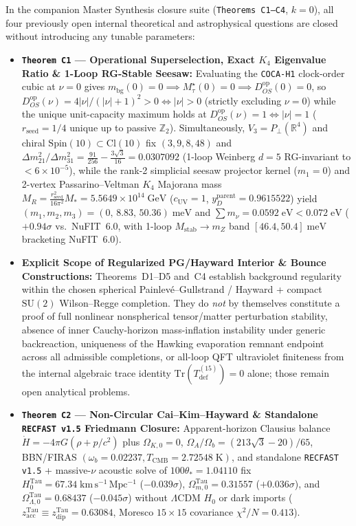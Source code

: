 \documentclass[11pt,a4paper]{article}
\theoremstyle{remark}
\begin{document}
In the companion Master Synthesis closure suite (\texttt{Theorems~C1--C4}, $k = 0$), all four previously open internal theoretical and astrophysical questions are closed without introducing any tunable parameters:
\begin{itemize}
  \item \textbf{\texttt{Theorem C1} --- Operational Superselection, Exact $K_4$ Eigenvalue Ratio \& 1-Loop RG-Stable Seesaw:} Evaluating the \texttt{COCA-H1} clock-order cubic at $\nu = 0$ gives $m_{\mathrm{bg}}(0) = 0 \implies M_\tau^\star(0) = 0 \implies D_{OS}^{\mathrm{op}}(0) = 0$, so $D_{OS}^{\mathrm{op}}(\nu) = 4|\nu|/(|\nu|+1)^2 > 0 \iff |\nu| > 0$ (strictly excluding $\nu = 0$) while the unique unit-capacity maximum holds at $D_{OS}^{\mathrm{op}}(\nu) = 1 \iff |\nu| = 1$ ($r_{\mathrm{seed}} = 1/4$ unique up to passive $\mathbb{Z}_2$). Simultaneously, $V_3 = P_\perp(\mathbb{R}^4)$ and chiral $\mathrm{Spin}(10) \subset \mathrm{Cl}(10)$ fix $(3, 9, 8, 48)$ and $\Delta m_{21}^2/\Delta m_{31}^2 = \frac{91}{256} - \frac{3\sqrt{3}}{16} = 0.0307092$ (1-loop Weinberg $d=5$ RG-invariant to $<6\times 10^{-5}$), while the rank-2 simplicial seesaw projector kernel ($m_1 = 0$) and 2-vertex Passarino--Veltman $K_4$ Majorana mass $M_R = \frac{r_{\mathrm{seed}}^2}{16\pi^2}M_* = 5.5649 \times 10^{14}\;\mathrm{GeV}$ ($c_{\mathrm{UV}} = 1$, $y_D^{\mathrm{parent}} = 0.9615522$) yield $(m_1, m_2, m_3) = (0,\, 8.83,\, 50.36)\;\mathrm{meV}$ and $\sum m_\nu = 0.0592\;\mathrm{eV} < 0.072\;\mathrm{eV}$ (\textbf{$+0.94\sigma$} vs.\ NuFIT~6.0, with 1-loop $M_{\mathrm{stab}}\to m_Z$ band $[46.4, 50.4]\;\mathrm{meV}$ bracketing NuFIT~6.0).
  \item \textbf{Explicit Scope of Regularized PG/Hayward Interior \& Bounce Constructions:} Theorems~D1--D5 and~C4 establish background regularity within the chosen spherical Painlev\'e--Gullstrand / Hayward + compact $\mathrm{SU}(2)$ Wilson--Regge completion. They do \emph{not} by themselves constitute a proof of full nonlinear nonspherical tensor/matter perturbation stability, absence of inner Cauchy-horizon mass-inflation instability under generic backreaction, uniqueness of the Hawking evaporation remnant endpoint across all admissible completions, or all-loop QFT ultraviolet finiteness from the internal algebraic trace identity $\mathrm{Tr}(T_{\mathrm{def}}^{(15)}) = 0$ alone; those remain open analytical problems.
  \item \textbf{\texttt{Theorem C2} --- Non-Circular Cai--Kim--Hayward \& Standalone \texttt{RECFAST v1.5} Friedmann Closure:} Apparent-horizon Clausius balance $\dot{H} = -4\pi G(\rho + p/c^2)$ plus $\Omega_{K,0} = 0$, $\Omega_A/\Omega_b = (213\sqrt{3}-20)/65$, BBN/FIRAS $(\omega_b = 0.02237, T_{\mathrm{CMB}} = 2.72548\;\mathrm{K})$, and standalone \texttt{RECFAST v1.5} + massive-$\nu$ acoustic solve of $100\theta_* = 1.04110$ fix $H_0^{\mathrm{Tau}} = 67.34\;\mathrm{km\,s^{-1}\,Mpc^{-1}}$ ($-0.039\sigma$), $\Omega_{m,0}^{\mathrm{Tau}} = 0.31557$ ($+0.036\sigma$), and $\Omega_{\Lambda,0}^{\mathrm{Tau}} = 0.68437$ ($-0.045\sigma$) without $\Lambda\mathrm{CDM}$ $H_0$ or dark imports ($z_{\mathrm{acc}}^{\mathrm{Tau}} \equiv z_{\mathrm{dip}}^{\mathrm{Tau}} = 0.63084$, Moresco $15\times 15$ covariance $\chi^2/N = 0.413$).

\end{itemize}
\end{document}
